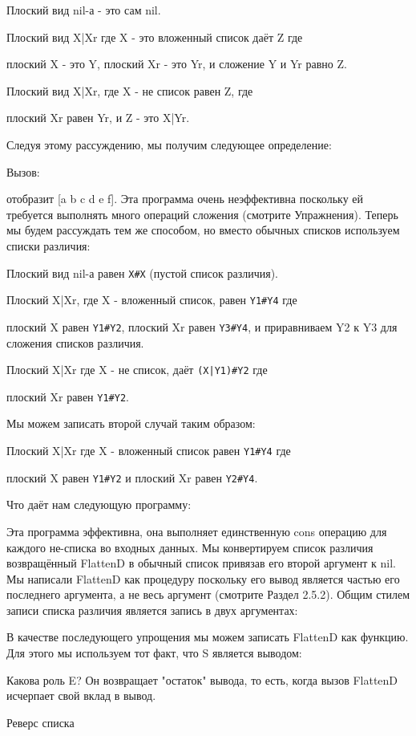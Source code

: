 Плоский вид nil-а - это сам nil.

Плоский вид X|Xr где X - это вложенный список даёт Z где

плоский X - это Y,
плоский Xr - это Yr, и
сложение Y и Yr равно Z.

Плоский вид X|Xr, где X - не список равен Z, где

плоский Xr равен Yr, и
Z - это X|Yr.

Следуя этому рассуждению, мы получим следующее определение:

Вызов:

отобразит [a b c d e f]. Эта программа очень неэффективна поскольку ей требуется выполнять много операций сложения (смотрите Упражнения). Теперь мы будем рассуждать тем же способом, но вместо обычных списков используем списки различия:

Плоский вид nil-а равен \verb|X#X| (пустой список различия).

Плоский X|Xr, где X - вложенный список, равен \verb|Y1#Y4| где

плоский X равен \verb|Y1#Y2|,
плоский Xr равен \verb|Y3#Y4|, и
приравниваем Y2 к Y3 для сложения списков различия.

Плоский X|Xr где X - не список, даёт \verb!(X|Y1)#Y2! где

плоский Xr равен \verb|Y1#Y2|.

Мы можем записать второй случай таким образом:

Плоский X|Xr где X - вложенный список равен \verb|Y1#Y4| где

плоский X равен \verb|Y1#Y2| и
плоский Xr равен \verb|Y2#Y4|.

Что даёт нам следующую программу:

Эта программа эффективна, она выполняет единственную cons операцию для каждого не-списка во входных данных. Мы конвертируем список различия возвращённый FlattenD в обычный список привязав его второй аргумент к nil. Мы написали FlattenD как процедуру поскольку его вывод является частью его последнего аргумента, а не весь аргумент (смотрите Раздел 2.5.2). Общим стилем записи списка различия является запись в двух аргументах:

В качестве последующего упрощения мы можем записать FlattenD как функцию. Для этого мы используем тот факт, что S является выводом:

Какова роль E? Он возвращает "остаток" вывода, то есть, когда вызов FlattenD исчерпает свой вклад в вывод.

Реверс списка

